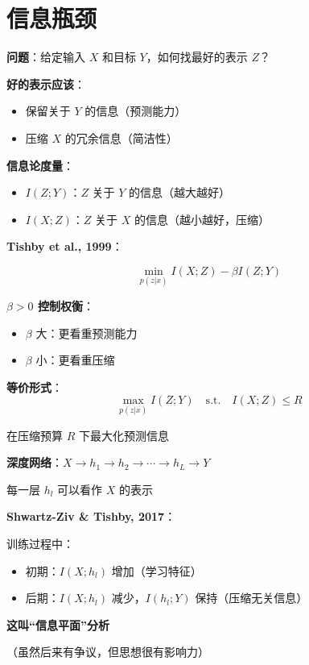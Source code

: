 \documentclass[12pt, a4paper]{ctexart}
\begin{document}
\section{信息瓶颈}

\begin{blackboard}[信息瓶颈的动机]

\textbf{问题}：给定输入 $X$ 和目标 $Y$，如何找最好的表示 $Z$？

\textbf{好的表示应该}：
\begin{itemize}
    \item 保留关于 $Y$ 的信息（预测能力）
    \item 压缩 $X$ 的冗余信息（简洁性）
\end{itemize}

\textbf{信息论度量}：
\begin{itemize}
    \item $I(Z; Y)$：$Z$ 关于 $Y$ 的信息（越大越好）
    \item $I(X; Z)$：$Z$ 关于 $X$ 的信息（越小越好，压缩）
\end{itemize}

\end{blackboard}

\begin{blackboard}[信息瓶颈目标]

\textbf{Tishby et al., 1999}：

\[
\boxed{\min_{p(z|x)} I(X; Z) - \beta I(Z; Y)}
\]

\textbf{$\beta > 0$ 控制权衡}：
\begin{itemize}
    \item $\beta$ 大：更看重预测能力
    \item $\beta$ 小：更看重压缩
\end{itemize}

\textbf{等价形式}：
\[
\max_{p(z|x)} I(Z; Y) \quad \text{s.t.} \quad I(X; Z) \leq R
\]

在压缩预算 $R$ 下最大化预测信息

\end{blackboard}

\begin{blackboard}[信息瓶颈与深度学习]

\textbf{深度网络}：$X \to h_1 \to h_2 \to \cdots \to h_L \to Y$

每一层 $h_l$ 可以看作 $X$ 的表示

\textbf{Shwartz-Ziv \& Tishby, 2017}：

训练过程中：
\begin{itemize}
    \item 初期：$I(X; h_l)$ 增加（学习特征）
    \item 后期：$I(X; h_l)$ 减少，$I(h_l; Y)$ 保持（压缩无关信息）
\end{itemize}

\textbf{这叫``信息平面''分析}

（虽然后来有争议，但思想很有影响力）

\end{blackboard}
\end{document}
